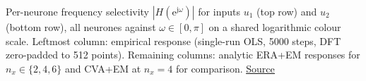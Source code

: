 Per-neurone frequency selectivity $|H(\mathrm{e}^{\mathrm{j}\omega})|$ for inputs $u_1$ (top row) and $u_2$ (bottom row), all neurones against $\omega \in [0, \pi]$ on a shared logarithmic colour scale. Leftmost column: empirical response (single-run OLS, 5000 steps, DFT zero-padded to 512 points). Remaining columns: analytic ERA+EM responses for $n_x \in \{2, 4, 6\}$ and CVA+EM at $n_x = 4$ for comparison. \href{https://github.com/tahmidazam/gg4/blob/main/notebooks/freq_map/freq_map.ipynb}{\underline{Source}}%